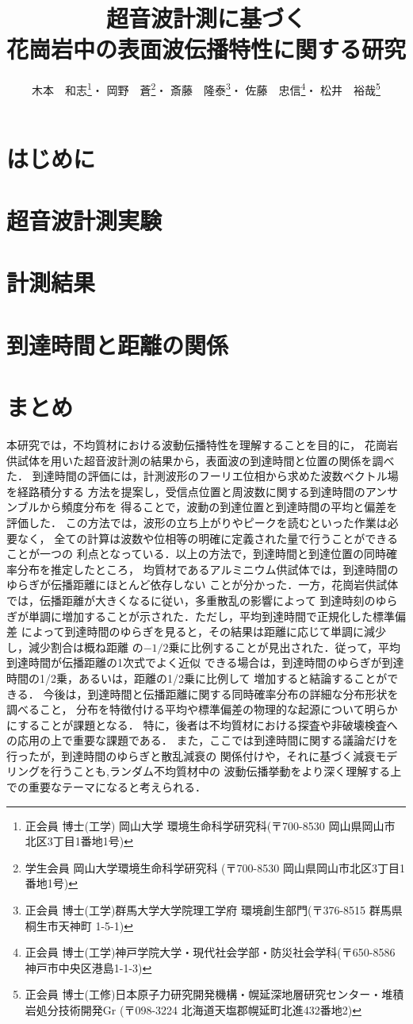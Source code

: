 \documentclass{jsce}
\title{
	超音波計測に基づく\\花崗岩中の表面波伝播特性に関する研究
}%
\author{木本　和志\thanks{正会員 博士(工学) 岡山大学 環境生命科学研究科(〒700-8530 岡山県岡山市北区3丁目1番地1号)\email{kimoto@okayama-u.ac.jp}}・
岡野　蒼\thanks{学生会員 岡山大学環境生命科学研究科 (〒700-8530 岡山県岡山市北区3丁目1番地1号)}・
斎藤　隆泰\thanks{正会員 博士(工学)群馬大学大学院理工学府 環境創生部門(〒376-8515 群馬県桐生市天神町 1-5-1)}・
佐藤　忠信\thanks{正会員 博士(工学)神戸学院大学・現代社会学部・防災社会学科(〒650-8586神戸市中央区港島1-1-3)}・
松井　裕哉\thanks{正会員 博士(工修)日本原子力研究開発機構・幌延深地層研究センター・堆積岩処分技術開発Gr
(〒098-3224 北海道天塩郡幌延町北進432番地2)}
}
\begin{document}
\maketitle
\section{はじめに}
	
\section{超音波計測実験}
	
\section{計測結果}
	
\section{到達時間と距離の関係 }
	
\section{まとめ}
本研究では，不均質材における波動伝播特性を理解することを目的に，
花崗岩供試体を用いた超音波計測の結果から，表面波の到達時間と位置の関係を調べた．
到達時間の評価には，計測波形のフーリエ位相から求めた波数ベクトル場を経路積分する
方法を提案し，受信点位置と周波数に関する到達時間のアンサンブルから頻度分布を
得ることで，波動の到達位置と到達時間の平均と偏差を評価した．
この方法では，波形の立ち上がりやピークを読むといった作業は必要なく，
全ての計算は波数や位相等の明確に定義された量で行うことができることが一つの
利点となっている．以上の方法で，到達時間と到達位置の同時確率分布を推定したところ，
均質材であるアルミニウム供試体では，到達時間のゆらぎが伝播距離にほとんど依存しない
ことが分かった．一方，花崗岩供試体では，伝播距離が大きくなるに従い，多重散乱の影響によって
到達時刻のゆらぎが単調に増加することが示された．ただし，平均到達時間で正規化した標準偏差
によって到達時間のゆらぎを見ると，その結果は距離に応じて単調に減少し，減少割合は概ね距離
の$-1/2$乗に比例することが見出された．従って，平均到達時間が伝播距離の1次式でよく近似
できる場合は，到達時間のゆらぎが到達時間の1/2乗，あるいは，距離の1/2乗に比例して
増加すると結論することができる．
今後は，到達時間と伝播距離に関する同時確率分布の詳細な分布形状を調べること，
分布を特徴付ける平均や標準偏差の物理的な起源について明らかにすることが課題となる．
特に，後者は不均質材における探査や非破壊検査への応用の上で重要な課題である．
また，ここでは到達時間に関する議論だけを行ったが，到達時間のゆらぎと散乱減衰の
関係付けや，それに基づく減衰モデリングを行うことも,ランダム不均質材中の
波動伝播挙動をより深く理解する上での重要なテーマになると考えられる．
\\
\end{document}
